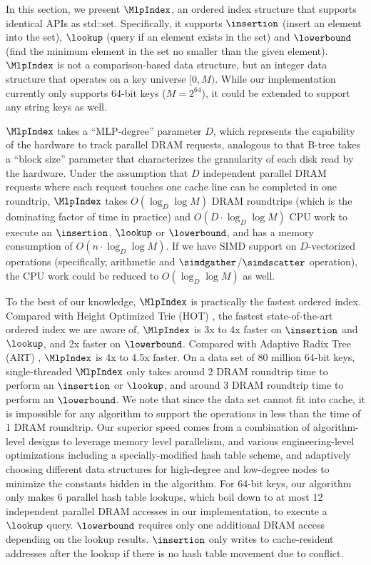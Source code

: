 \documentclass[11pt, usletter]{article}
\begin{document}
In this section, we present $\MlpIndex$, an ordered index structure that supports identical APIs as std::set.
Specifically, it supports $\insertion$ (insert an element into the set), $\lookup$ (query if an element exists in the set) 
and $\lowerbound$ (find the minimum element in the set no smaller than the given element).
$\MlpIndex$ is not a comparison-based data structure, but an integer data structure that operates on a key universe $[0,M)$.
While our implementation currently only supports 64-bit keys ($M=2^{64}$), it could be extended to support any string keys as well.

$\MlpIndex$ takes a ``MLP-degree'' parameter $D$, 
which represents the capability of the hardware to track parallel DRAM requests, 
analogous to that B-tree takes a ``block size'' parameter that characterizes the granularity of each disk read by the hardware.
Under the assumption that $D$ independent parallel DRAM requests where each request touches one cache line can be completed in one roundtrip,
$\MlpIndex$ takes $O(\log_D\log M)$ DRAM roundtrips (which is the dominating factor of time in practice) 
and $O(D\cdot\log_D\log M)$ CPU work to execute an $\insertion$, $\lookup$ or $\lowerbound$,
and has a memory consumption of $O(n\cdot \log_D\log M)$.
If we have SIMD support on $D$-vectorized operations (specifically, arithmetic and $\simdgather$/$\simdscatter$ operation), 
the CPU work could be reduced to $O(\log_D\log M)$ as well.

To the best of our knowledge, $\MlpIndex$ is practically the fastest ordered index. 
Compared with Height Optimized Trie (HOT) \cite{hot_sigmod18}, 
the fastest state-of-the-art ordered index we are aware of, 
$\MlpIndex$ is 3x to 4x faster on $\insertion$ and $\lookup$, 
and 2x faster on $\lowerbound$.
Compared with Adaptive Radix Tree (ART) \cite{arttrie_icde13}, $\MlpIndex$ is 4x to 4.5x faster. 
On a data set of 80 million 64-bit keys, single-threaded $\MlpIndex$ only takes around 2 DRAM roundtrip time to perform 
an $\insertion$ or $\lookup$, and around 3 DRAM roundtrip time to perform an $\lowerbound$.
We note that since the data set cannot fit into cache, 
it is impossible for any algorithm to support the operations in less than the time of 1 DRAM roundtrip.
Our superior speed 
comes from a combination of algorithm-level designs to leverage memory level parallelism, 
and various engineering-level optimizations including a specially-modified hash table scheme, 
and adaptively choosing different data structures for high-degree and low-degree nodes 
to minimize the constants hidden in the algorithm.
For 64-bit keys, our algorithm only makes 6 parallel hash table lookups, 
which boil down to at most 12 independent parallel DRAM accesses in our implementation,
to execute a $\lookup$ query. $\lowerbound$ requires only one additional DRAM access
depending on the lookup results. 
$\insertion$ only writes to cache-resident addresses after the lookup 
if there is no hash table movement due to conflict.
\end{document}
